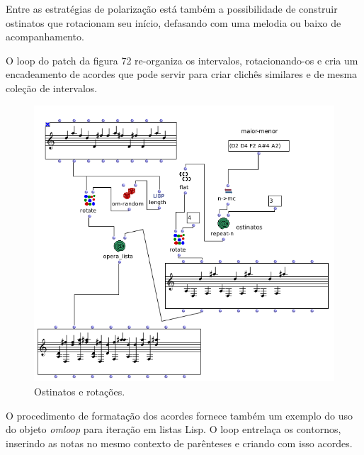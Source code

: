 \documentclass[
	12pt,				%
	openright,			%
	twoside,			%
	a4paper,			%
	english,			%
	french,				%
	spanish,			%
	brazil				%
	]{abntex2}
\begin{document}
Entre as estratégias de polarização está também a possibilidade de construir ostinatos que rotacionam seu início, defasando com uma melodia ou baixo de acompanhamento. 

O loop do patch da figura 72 re-organiza os intervalos, rotacionando-os e cria um encadeamento de acordes que pode servir para criar clichês similares e de mesma coleção de intervalos.


\begin{figure}[!h]
	\caption{\label{fig_grafico}Ostinatos e rotações. }
	\begin{center}
	    \includegraphics[scale=0.5]{OMPD/motivicos01.png}
	\end{center}
\end{figure}

O procedimento de formatação dos acordes fornece também um exemplo do uso do objeto \textit{omloop} para iteração em listas Lisp. O loop entrelaça os contornos, inserindo as notas no mesmo contexto de parênteses e criando com isso acordes.
\end{document}
